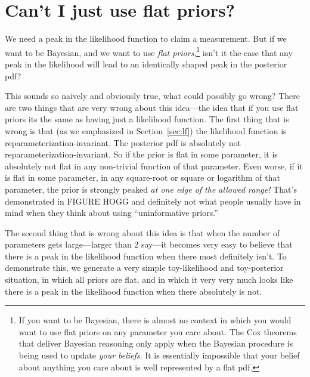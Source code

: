 \documentclass{article}
\newcommand{\sectionname}{Section}
\newcommand{\secref}[1]{\sectionname~\ref{#1}}
\begin{document}
\section{Can't I just use flat priors?}\label{sec:flat}
We need a peak in the likelihood function to claim a measurement.
But if we want to be Bayesian, and we want to use \emph{flat priors},\footnote{%
If you want to be Bayesian, there is almost no context in which you would want to use flat priors on any parameter you care about.
The Cox theorems that deliver Bayesian reasoning only apply when the Bayesian procedure is being used to update \emph{your beliefs}.
It is essentially impossible that your belief about anything you care about is well represented by a flat pdf.}
isn't it the case that any peak in the likelihood will lead to an identically shaped peak in the posterior pdf?

This sounds so naively and obviously true, what could possibly go wrong?
There are two things that are very wrong about this idea---the idea that if you use flat priors its the same as having just a likelihood function.
The first thing that is wrong is that (as we emphasized in \secref{sec:lf}) the likelihood function is reparameterization-invariant.
The posterior pdf is absolutely not reparameterization-invariant.
So if the prior is flat in some parameter, it is absolutely not flat in any non-trivial function of that parameter.
Even worse, if it is flat in some parameter, in any square-root or square or logarithm of that parameter, the prior is strongly peaked \emph{at one edge of the allowed range!}
That's demonstrated in FIGURE HOGG and definitely not what people usually have in mind when they think about using ``uninformative priors.''

The second thing that is wrong about this idea is that when the number of parameters gets large---larger than 2 say---it becomes very easy to believe that there is a peak in the likelihood function when there most definitely isn't.
To demonstrate this, we generate a very simple toy-likelihood and toy-posterior situation, in which all priors are flat, and in which it very very much looks like there is a peak in the likelihood function when there absolutely is not.
\end{document}

